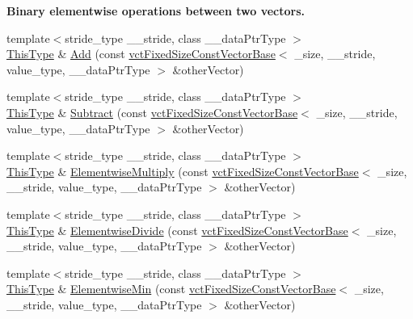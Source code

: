 \begin{Indent}{\bf Binary elementwise operations between two vectors.}
\begin{DoxyCompactItemize}
{\footnotesize template$<$stride\+\_\+type \+\_\+\+\_\+stride, class \+\_\+\+\_\+data\+Ptr\+Type $>$ }\\\hyperlink{classvct_fixed_size_const_vector_base_a071063bc4fa43112cc287b2dbef53180}{This\+Type} \& \hyperlink{classvct_fixed_size_vector_base_a802695215dba1acb0f0bdf29bc372c8d}{Add} (const \hyperlink{classvct_fixed_size_const_vector_base}{vct\+Fixed\+Size\+Const\+Vector\+Base}$<$ \+\_\+size, \+\_\+\+\_\+stride, value\+\_\+type, \+\_\+\+\_\+data\+Ptr\+Type $>$ \&other\+Vector)
\item 
{\footnotesize template$<$stride\+\_\+type \+\_\+\+\_\+stride, class \+\_\+\+\_\+data\+Ptr\+Type $>$ }\\\hyperlink{classvct_fixed_size_const_vector_base_a071063bc4fa43112cc287b2dbef53180}{This\+Type} \& \hyperlink{classvct_fixed_size_vector_base_af130d2812aec62e18f7d422ae48110ac}{Subtract} (const \hyperlink{classvct_fixed_size_const_vector_base}{vct\+Fixed\+Size\+Const\+Vector\+Base}$<$ \+\_\+size, \+\_\+\+\_\+stride, value\+\_\+type, \+\_\+\+\_\+data\+Ptr\+Type $>$ \&other\+Vector)
\item 
{\footnotesize template$<$stride\+\_\+type \+\_\+\+\_\+stride, class \+\_\+\+\_\+data\+Ptr\+Type $>$ }\\\hyperlink{classvct_fixed_size_const_vector_base_a071063bc4fa43112cc287b2dbef53180}{This\+Type} \& \hyperlink{classvct_fixed_size_vector_base_ad68ef93b9c3e1039589ee6a2a30106aa}{Elementwise\+Multiply} (const \hyperlink{classvct_fixed_size_const_vector_base}{vct\+Fixed\+Size\+Const\+Vector\+Base}$<$ \+\_\+size, \+\_\+\+\_\+stride, value\+\_\+type, \+\_\+\+\_\+data\+Ptr\+Type $>$ \&other\+Vector)
\item 
{\footnotesize template$<$stride\+\_\+type \+\_\+\+\_\+stride, class \+\_\+\+\_\+data\+Ptr\+Type $>$ }\\\hyperlink{classvct_fixed_size_const_vector_base_a071063bc4fa43112cc287b2dbef53180}{This\+Type} \& \hyperlink{classvct_fixed_size_vector_base_a0225335e76b1db401cc1e2b1375f046b}{Elementwise\+Divide} (const \hyperlink{classvct_fixed_size_const_vector_base}{vct\+Fixed\+Size\+Const\+Vector\+Base}$<$ \+\_\+size, \+\_\+\+\_\+stride, value\+\_\+type, \+\_\+\+\_\+data\+Ptr\+Type $>$ \&other\+Vector)
\item 
{\footnotesize template$<$stride\+\_\+type \+\_\+\+\_\+stride, class \+\_\+\+\_\+data\+Ptr\+Type $>$ }\\\hyperlink{classvct_fixed_size_const_vector_base_a071063bc4fa43112cc287b2dbef53180}{This\+Type} \& \hyperlink{classvct_fixed_size_vector_base_a856b0447ea1f83cf9a13c1ace5dff4fe}{Elementwise\+Min} (const \hyperlink{classvct_fixed_size_const_vector_base}{vct\+Fixed\+Size\+Const\+Vector\+Base}$<$ \+\_\+size, \+\_\+\+\_\+stride, value\+\_\+type, \+\_\+\+\_\+data\+Ptr\+Type $>$ \&other\+Vector)

\end{DoxyCompactItemize}
\end{Indent}
